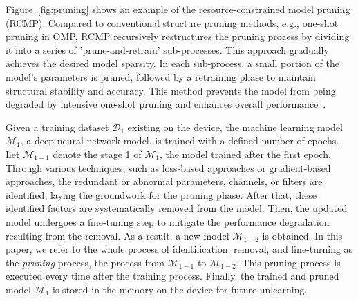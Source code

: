 \documentclass[conference,compsoc]{IEEEtran}
\begin{document}
Figure~\ref{fig:pruning} shows an example of the resource-constrained model pruning (RCMP). Compared to conventional structure pruning methods, e.g., one-shot pruning in OMP, RCMP recursively restructures the pruning process by dividing it into a series of 'prune-and-retrain' sub-processes. This approach gradually achieves the desired model sparsity. In each sub-process, a small portion of the model's parameters is pruned, followed by a retraining phase to maintain structural stability and accuracy. This method prevents the model from being degraded by intensive one-shot pruning and enhances overall performance~\cite{zhu2017prune}.

Given a training dataset $\mathcal{D}_1$ existing on the device, the machine learning model $\mathcal{M}_1$, \eg a deep neural network model, is trained with a defined number of epochs. Let $\mathcal{M}_{1-1}$ denote the stage 1 of $\mathcal{M}_1$, \ie the model trained after the first epoch. Through various techniques, such as loss-based approaches or gradient-based approaches, the redundant or abnormal parameters, channels, or filters are identified, laying the groundwork for the pruning phase. After that, these identified factors are systematically removed from the model. Then, the updated model undergoes a fine-tuning step to mitigate the performance degradation resulting from the removal. As a result, a new model $\mathcal{M}_{1-2}$ is obtained. In this paper, we refer to the whole process of identification, removal, and fine-turning as the \textit{pruning} process, \eg the process from $\mathcal{M}_{1-1}$ to $\mathcal{M}_{1-2}$. This pruning process is executed every time after the training process. Finally, the trained and pruned model $\mathcal{M}_1$ is stored in the memory on the device for future unlearning. 
\end{document}
